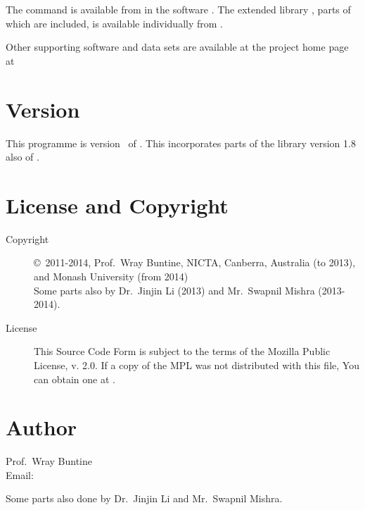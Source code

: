 \documentclass[a4paper,english]{article}
\begin{document}
The command  is available from  in 
the software .
The extended library , parts of which are included, is available
individually from .

Other supporting software and data sets are available at the project home
page at\\

\section{Version}

This programme is version \Version\ of \Date.
This incorporates parts of the library  version 1.8
also of \Date.

\section{License and Copyright}

\begin{description}
\item[Copyright] \copyright\ 2011-2014, Prof.~Wray Buntine, 
  NICTA, Canberra, Australia (to 2013), and Monash
University (from 2014)\\
Some parts also by Dr.\ Jinjin Li (2013) and 
Mr.\ Swapnil Mishra (2013-2014).

\item[License]  This Source Code Form is subject to the terms of the Mozilla 
 Public License, v. 2.0. If a copy of the MPL was not
 distributed with this file, You can obtain one at
      .
\end{description}

\section{Author}

\noindent
Prof.~Wray Buntine                     \\
Email:   

Some parts also done by Dr.\ Jinjin Li and 
Mr.\ Swapnil Mishra.

\LatexManEnd
\end{document}
